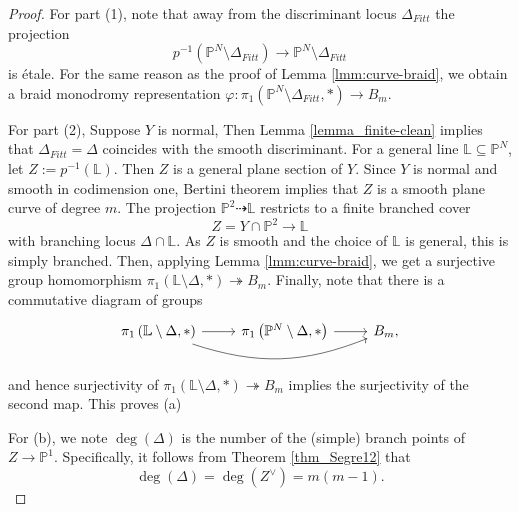 \documentclass[12pt]{amsart}
\DeclareMathOperator{\Mod}{\mathrm{Mod}}%
\DeclareMathOperator{\Sing}{Sing}%
\begin{document}
\begin{proof}
   For part (1), note that away from the discriminant locus $\Delta_{Fitt}$ the projection $$p^{-1} (\mathbb{P}^N\setminus \Delta_{Fitt})\to\mathbb{P}^N\setminus \Delta_{Fitt}$$is \'etale. For the same reason as the proof of Lemma \ref{lmm:curve-braid}, we obtain a braid monodromy representation $\varphi:\pi_1\left(\mathbb{P}^N\setminus\Delta_{Fitt},\ast\right)\to B_m$. %
    
   For part (2), Suppose $Y$ is normal, %
  Then Lemma \ref{lemma_finite-clean} implies that $\Delta_{Fitt}=\Delta$ coincides with the smooth discriminant.
For a general line $\mathbb{L}\subseteq\mathbb{P}^N$, let $Z:=p^{-1} (\mathbb{L})$. Then $Z$ is a general plane section of $Y$. Since $Y$ is normal and smooth in codimension one, Bertini theorem implies that $Z$ is a smooth plane curve of degree $m$. The projection $\mathbb{P}^2\dashrightarrow\mathbb{L}$ restricts to a finite branched cover 
    $$Z=Y\cap\mathbb{P}^2\to \mathbb{L}$$
    with branching locus $\Delta\cap\mathbb{L}$. As $Z$ is smooth and the choice of $\mathbb{L}$ is general, this is simply branched. Then, applying Lemma \ref{lmm:curve-braid}, we get a surjective group homomorphism $\pi_1\left(\mathbb{L}\setminus\Delta,\ast\right)\twoheadrightarrow B_m$. Finally, note that there is a commutative diagram of groups
    \[
    \begin{tikzcd}
        \pi_1\left(\mathbb{L}\setminus\Delta,\ast\right)\arrow[r]\arrow[rr,bend right=20]&\pi_1\left(\mathbb{P}^N\setminus\Delta,\ast\right)\arrow[r]&B_m,
    \end{tikzcd}
    \]and hence surjectivity of $\pi_1\left(\mathbb{L}\setminus\Delta,\ast\right)\twoheadrightarrow B_m$ implies the surjectivity of the second map. This proves (a)\par

   For (b), we note $\deg(\Delta)$ is the number of the (simple) branch points of $Z\to \mathbb P^1$. Specifically, it follows from Theorem \ref{thm_Segre12} that
 $$\deg(\Delta)=\deg(Z^{\vee})=m(m-1).$$
 

\end{proof}
\end{document}
